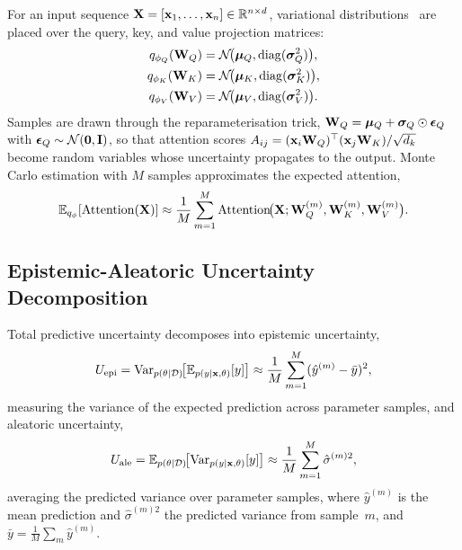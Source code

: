 For an input sequence $\mathbf{X}=[\mathbf{x}_1,\dots,\mathbf{x}_n]\in\mathbb{R}^{n\times d}$, variational distributions~\cite{Blundell2015} are placed over the query, key, and value projection matrices:
\begin{align}
q_{\phi_Q}(\mathbf{W}_Q) &= \mathcal{N}\!\bigl(\bm{\mu}_Q,\mathrm{diag}(\bm{\sigma}_Q^2)\bigr), \notag\\
q_{\phi_K}(\mathbf{W}_K) &= \mathcal{N}\!\bigl(\bm{\mu}_K,\mathrm{diag}(\bm{\sigma}_K^2)\bigr), \notag\\
q_{\phi_V}(\mathbf{W}_V) &= \mathcal{N}\!\bigl(\bm{\mu}_V,\mathrm{diag}(\bm{\sigma}_V^2)\bigr).
\label{eq:stoch_var_attn}
\end{align}
Samples are drawn through the reparameterisation trick, $\mathbf{W}_Q=\bm{\mu}_Q+\bm{\sigma}_Q\odot\bm{\epsilon}_Q$ with $\bm{\epsilon}_Q\sim\mathcal{N}(\mathbf{0},\mathbf{I})$, so that attention scores $A_{ij}=(\mathbf{x}_i\mathbf{W}_Q)^\top(\mathbf{x}_j\mathbf{W}_K)/\sqrt{d_k}$ become random variables whose uncertainty propagates to the output. Monte Carlo estimation with $M$ samples approximates the expected attention,
\begin{equation}
\mathbb{E}_{q_\phi}[\mathrm{Attention}(\mathbf{X})]
\approx \frac{1}{M}\sum_{m=1}^{M}
  \mathrm{Attention}\!\bigl(\mathbf{X};\mathbf{W}_Q^{(m)},\mathbf{W}_K^{(m)},\mathbf{W}_V^{(m)}\bigr).
\label{eq:stoch_mc_attn}
\end{equation}

\subsection{Epistemic-Aleatoric Uncertainty Decomposition}

Total predictive uncertainty decomposes into epistemic uncertainty,\begin{equation}
U_{\mathrm{epi}}
= \mathrm{Var}_{p(\theta|\mathcal{D})}\!\bigl[\mathbb{E}_{p(y|\mathbf{x},\theta)}[y]\bigr]
\approx \frac{1}{M}\sum_{m=1}^{M}(\hat{y}^{(m)}-\bar{y})^2,
\label{eq:stoch_epi}
\end{equation}measuring the variance of the expected prediction across parameter samples, and aleatoric uncertainty,\begin{equation}
U_{\mathrm{ale}}
= \mathbb{E}_{p(\theta|\mathcal{D})}\!\bigl[\mathrm{Var}_{p(y|\mathbf{x},\theta)}[y]\bigr]
\approx \frac{1}{M}\sum_{m=1}^{M}\hat{\sigma}^{(m)2},
\label{eq:stoch_ale}
\end{equation}
averaging the predicted variance over parameter samples, where $\hat{y}^{(m)}$ is the mean prediction and $\hat{\sigma}^{(m)2}$ the predicted variance from sample~$m$, and $\bar{y}=\frac{1}{M}\sum_m\hat{y}^{(m)}$.

